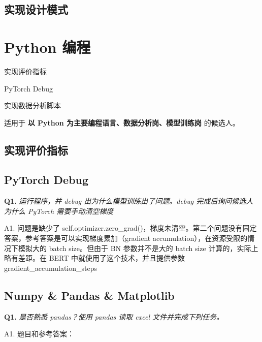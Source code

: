 \documentclass[cn,10pt,math=newtx,citestyle=gb7714-2015,bibstyle=gb7714-2015]{elegantbook}
\begin{document}
\subsection{实现设计模式}

\newpage


\section{Python 编程}

\begin{introduction}
\item 实现评价指标
\item PyTorch Debug
\item 实现数据分析脚本
\end{introduction}

适用于 \textbf{以 Python 为主要编程语言、数据分析岗、模型训练岗} 的候选人。

\subsection{实现评价指标}

\subsection{PyTorch Debug}

\textbf{Q1.} \textit{运行程序，并 debug 出为什么模型训练出了问题。debug 完成后询问候选人为什么 PyTorch 需要手动清空梯度}

A1. 问题是缺少了 self.optimizer.zero\_grad()，梯度未清空。第二个问题没有固定答案，参考答案是可以实现梯度累加（gradient accumulation），在资源受限的情况下模拟大的 batch size。但由于 BN 参数并不是大的 batch size 计算的，实际上略有差距。在 BERT 中就使用了这个技术，并且提供参数 gradient\_accumulation\_steps

\subsection{Numpy \& Pandas \& Matplotlib}

\textbf{Q1.} \textit{是否熟悉 pandas？使用 pandas 读取 excel 文件并完成下列任务。}

A1. 题目和参考答案：
\end{document}
